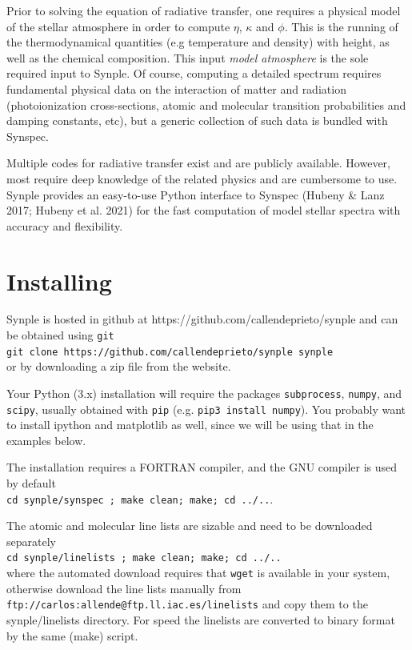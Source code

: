 \documentclass[]{article}
\begin{document}
Prior to solving the equation of radiative transfer, one requires a physical model of the stellar atmosphere in order to compute $\eta$, $\kappa$ and $\phi$. This is the running of the thermodynamical quantities (e.g temperature and density) with height, as well as the chemical composition. This input {\it model atmosphere} is the sole required input to Synple.  Of course, computing a detailed spectrum requires fundamental physical data on the interaction of matter and radiation (photoionization cross-sections, atomic and molecular transition probabilities and damping constants, etc), but a generic collection of such data is bundled with Synspec.

Multiple codes for radiative transfer exist and are publicly available. However, most require deep knowledge of the related physics and are cumbersome to use. Synple provides an easy-to-use Python interface to Synspec (Hubeny \& Lanz 2017; Hubeny et al. 2021) for the fast computation of model stellar spectra with accuracy and flexibility.



\section{Installing}

Synple is hosted in github at https://github.com/callendeprieto/synple
and can be obtained using {\tt git} 
\\ {\tt git clone https://github.com/callendeprieto/synple synple} \\
\noindent or by downloading a zip file from the website.

Your Python (3.x) installation  will require the packages {\tt subprocess}, {\tt numpy}, and {\tt scipy}, usually obtained with {\tt pip} (e.g. {\tt pip3 install numpy}). You probably want to install ipython and matplotlib as well, since we will be using that in the examples below. 

The installation requires a FORTRAN compiler, and the GNU compiler is used by default
\\ {\tt cd synple/synspec ; make clean; make; cd ../..}.

The atomic and molecular line lists are sizable and need to be downloaded separately
\\ {\tt cd synple/linelists ; make clean; make; cd ../..} \\
\noindent where the automated download requires that {\tt wget} is available in your system, otherwise download the line lists manually from \\ {\tt ftp://carlos:allende@ftp.ll.iac.es/linelists} and copy them to the synple/linelists directory. For speed the linelists are converted to binary format by the same (make) script.
\end{document}
